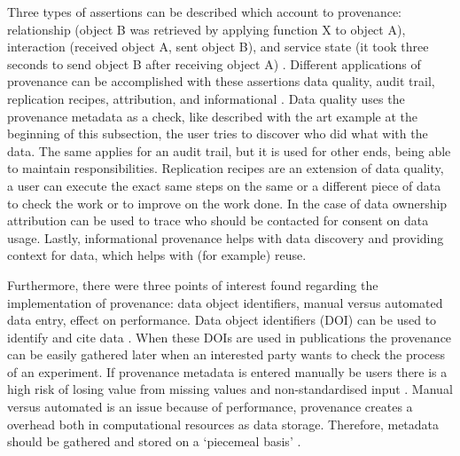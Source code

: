 
Three types of assertions can be described which account to provenance: relationship (object B was retrieved by applying function X to object A), interaction (received object A, sent object B), and service state (it took three seconds to send object B after receiving object A) \cite{dsp4moreau}.
Different applications of provenance can be accomplished with these assertions \eg{} data quality, audit trail, replication recipes, attribution, and informational \cite{dsp1simmhan}.
Data quality uses the provenance metadata as a check, like described with the art example at the beginning of this subsection, the user tries to discover who did what with the data.
The same applies for an audit trail, but it is used for other ends, being able to maintain responsibilities.
Replication recipes are an extension of data quality, a user can execute the exact same steps on the same or a different piece of data to check the work or to improve on the work done.
In the case of data ownership attribution can be used to trace who should be contacted for consent on data usage.
Lastly, informational provenance helps with data discovery and providing context for data, which helps with (for example) reuse.

Furthermore, there were three points of interest found regarding the implementation of provenance: data object identifiers, manual versus automated data entry, effect on performance.
Data object identifiers (DOI) can be used to identify and cite data \cite{dsp1simmhan}.
When these DOIs are used in publications the provenance can be easily gathered later when an interested party wants to check the process of an experiment.
If provenance metadata is entered manually be users there is a high risk of losing value from missing values and non-standardised input \cite{dsp1simmhan}.
Manual versus automated is an issue because of performance, provenance creates a overhead both in computational resources as data storage.
Therefore, metadata should be gathered and stored on a `piecemeal basis' \cite{dsp4moreau}.